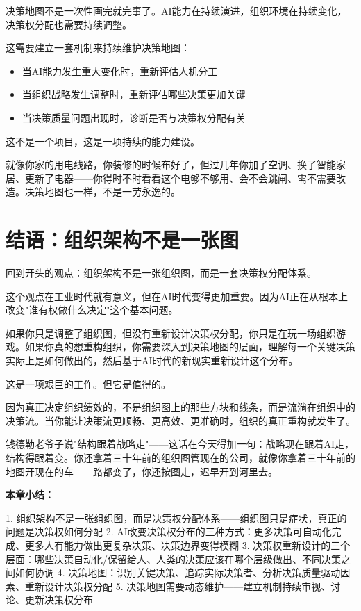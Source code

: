 决策地图不是一次性画完就完事了。AI能力在持续演进，组织环境在持续变化，决策权分配也需要持续调整。

这需要建立一套机制来持续维护决策地图：

\begin{itemize}
\item 当AI能力发生重大变化时，重新评估人机分工
\item 当组织战略发生调整时，重新评估哪些决策更加关键
\item 当决策质量问题出现时，诊断是否与决策权分配有关

\end{itemize}
这不是一个项目，这是一项持续的能力建设。

就像你家的用电线路，你装修的时候布好了，但过几年你加了空调、换了智能家居、更新了电器——你得时不时看看这个电够不够用、会不会跳闸、需不需要改造。决策地图也一样，不是一劳永逸的。

\section{结语：组织架构不是一张图}


回到开头的观点：组织架构不是一张组织图，而是一套决策权分配体系。

这个观点在工业时代就有意义，但在AI时代变得更加重要。因为AI正在从根本上改变"谁有权做什么决定"这个基本问题。

如果你只是调整了组织图，但没有重新设计决策权分配，你只是在玩一场组织游戏。如果你真的想重构组织，你需要深入到决策地图的层面，理解每一个关键决策实际上是如何做出的，然后基于AI时代的新现实重新设计这个分布。

这是一项艰巨的工作。但它是值得的。

因为真正决定组织绩效的，不是组织图上的那些方块和线条，而是流淌在组织中的决策流。当你能让决策流更顺畅、更高效、更准确时，组织的真正重构就发生了。

钱德勒老爷子说"结构跟着战略走"——这话在今天得加一句：战略现在跟着AI走，结构得跟着变。你还拿着三十年前的组织图管现在的公司，就像你拿着三十年前的地图开现在的车——路都变了，你还按图走，迟早开到河里去。


\textbf{本章小结：}

1. 组织架构不是一张组织图，而是决策权分配体系——组织图只是症状，真正的问题是决策权如何分配
2. AI改变决策权分布的三种方式：更多决策可自动化完成、更多人有能力做出更复杂决策、决策边界变得模糊
3. 决策权重新设计的三个层面：哪些决策自动化/保留给人、人类的决策应该在哪个层级做出、不同决策之间如何协调
4. 决策地图：识别关键决策、追踪实际决策者、分析决策质量驱动因素、重新设计决策权分配
5. 决策地图需要动态维护——建立机制持续审视、讨论、更新决策权分布

